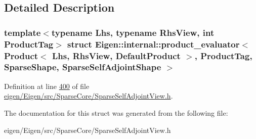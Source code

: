 \subsection{Detailed Description}
\subsubsection*{template$<$typename Lhs, typename Rhs\+View, int Product\+Tag$>$\newline
struct Eigen\+::internal\+::product\+\_\+evaluator$<$ Product$<$ Lhs, Rhs\+View, Default\+Product $>$, Product\+Tag, Sparse\+Shape, Sparse\+Self\+Adjoint\+Shape $>$}



Definition at line \hyperlink{eigen_2_eigen_2src_2_sparse_core_2_sparse_self_adjoint_view_8h_source_l00400}{400} of file \hyperlink{eigen_2_eigen_2src_2_sparse_core_2_sparse_self_adjoint_view_8h_source}{eigen/\+Eigen/src/\+Sparse\+Core/\+Sparse\+Self\+Adjoint\+View.\+h}.



The documentation for this struct was generated from the following file\+:\begin{DoxyCompactItemize}
\item 
eigen/\+Eigen/src/\+Sparse\+Core/\+Sparse\+Self\+Adjoint\+View.\+h\end{DoxyCompactItemize}
